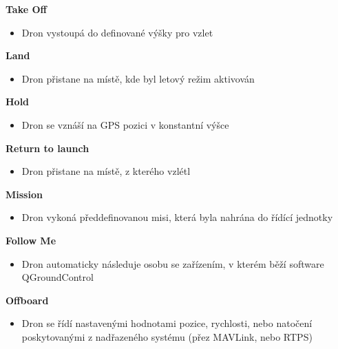 \noindent\textbf{Take Off}

\begin{itemize}
    \item Dron vystoupá do definované výšky pro vzlet
\end{itemize}

\noindent\textbf{Land}

\begin{itemize}
    \item Dron přistane na místě, kde byl letový režim aktivován
\end{itemize}

\noindent\textbf{Hold}

\begin{itemize}
    \item Dron se vznáší na GPS pozici v konstantní výšce
\end{itemize}

\noindent\textbf{Return to launch}

\begin{itemize}
    \item Dron přistane na místě, z kterého vzlétl
\end{itemize}

\noindent\textbf{Mission}

\begin{itemize}
    \item Dron vykoná předdefinovanou misi, která byla nahrána do řídící jednotky
\end{itemize}

\noindent\textbf{Follow Me}

\begin{itemize}
    \item Dron automaticky následuje osobu se zařízením, v kterém běží software QGroundControl
\end{itemize}

\noindent\textbf{Offboard}

\begin{itemize}
    \item Dron se řídí nastavenými hodnotami pozice, rychlosti, nebo natočení poskytovanými z nadřazeného systému (přez MAVLink, nebo \acs{RTPS})
\end{itemize}

